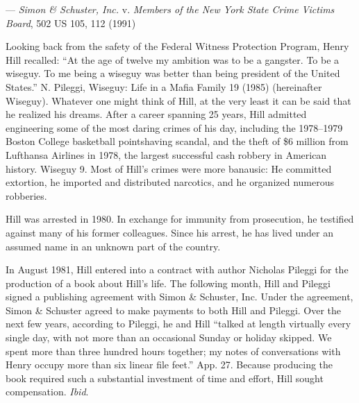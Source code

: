 \setupleglipsum%
{--- \textit{Simon \& Schuster, Inc.} v. \textit{Members of the New York State Crime Victims Board}, 502 US 105, 112 (1991)}
{Looking back from the safety of the Federal Witness Protection
Program, Henry Hill recalled: “At the age of twelve
my ambition was to be a gangster. To be a wiseguy. To
me being a wiseguy was better than being president of the
United States.” N. Pileggi, Wiseguy: Life in a Mafia Family
19 (1985) (hereinafter Wiseguy). Whatever one might think
of Hill, at the very least it can be said that he realized his
dreams. After a career spanning 25 years, Hill admitted
engineering some of the most daring crimes of his day,
including the 1978–1979 Boston College basketball pointshaving
scandal, and the theft of \$6 million from Lufthansa
Airlines in 1978, the largest successful cash robbery in
American history. Wiseguy 9. Most of Hill’s crimes were
more banausic: He committed extortion, he imported and distributed
narcotics, and he organized numerous robberies.\par
Hill was arrested in 1980. In exchange for immunity from
prosecution, he testified against many of his former colleagues.
Since his arrest, he has lived under an assumed
name in an unknown part of the country.\par
In August 1981, Hill entered into a contract with author
Nicholas Pileggi for the production of a book about Hill’s life.
The following month, Hill and Pileggi signed a publishing
agreement with Simon \& Schuster, Inc. Under the agreement,
Simon \& Schuster agreed to make payments to both
Hill and Pileggi. Over the next few years, according to Pileggi,
he and Hill “talked at length virtually every single
day, with not more than an occasional Sunday or holiday
skipped. We spent more than three hundred hours together;
my notes of conversations with Henry occupy more
than six linear file feet.” App. 27. Because producing the
book required such a substantial investment of time and effort,
Hill sought compensation. \textit{Ibid}.\par
}

